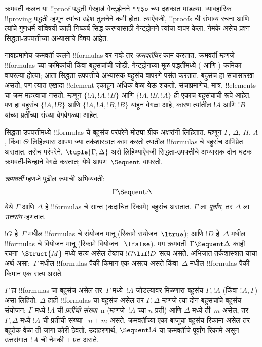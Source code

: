 \documentclass[../../../include/open-logic-section]{subfiles}
\begin{document}


क्रमवर्ती कलन या !!{proof} पद्धती गेरहार्ड
गेन्ट्झेनने १९३० च्या दशकात मांडल्या. व्यावहारिक
!!{proving} पद्धती म्हणून त्यांचा उद्देश तुलनेने कमी
होता. त्याऐवजी, !!{proof}s ची संभाव्य रचना आणि
त्यांचे गुणधर्म यांविषयी काही निष्कर्ष सिद्ध करण्यासाठी
गेन्ट्झेनने त्यांचा वापर केला. नेमके असेच प्रश्न
सिद्धता-उपपत्तीच्या अभ्यासाचे विषय आहेत.

नावाप्रमाणेच क्रमवर्ती कलने !!{formula}s वर
नव्हे तर \emph{क्रमवर्तींवर} काम करतात. क्रमवर्ती
म्हणजे !!{formula}s च्या क्रमिकांची किंवा बहुसंचांची
जोडी. गेन्ट्झेनच्या मूळ पद्धतींमध्ये ( आणि
) क्रमिका वापरल्या होत्या; आता
सिद्धता-उपपत्तीचे अभ्यासक बहुसंच वापरणे पसंत करतात.
बहुसंच हा संचासारखा असतो, पण त्यात एखादा
!!{element} एकाहून अधिक वेळा येऊ शकतो.
संचाप्रमाणेच, मात्र, !!{element}s चा क्रम महत्त्वाचा
नसतो. म्हणून $\{!A, !A, !B\}$ आणि
$\{!A, !B, !A\}$ ही एकाच बहुसंचाची रूपे आहेत.
पण हा बहुसंच $\{!A,
!B\}$ आणि $\{!A, !A, !B, !B\}$ यांहून वेगळा आहे,
कारण त्यांतील $!A$ आणि $!B$ यांच्या प्रतींच्या
संख्या वेगवेगळ्या आहेत.

सिद्धता-उपपत्तीमध्ये !!{formula}s चे बहुसंच
परंपरेने मोठ्या ग्रीक अक्षरांनी लिहितात. म्हणून
$\Gamma$, $\Delta$, $\Pi$, $\Lambda$, किंवा
$\Theta$ लिहिल्यास आपण ज्या तर्कशास्त्रात काम
करतो त्यातील !!{formula}s चे बहुसंच अभिप्रेत असतात.
तसेच परंपरेने, $\tuple{\Gamma, \Delta}$ असे लिहिण्याऐवजी
सिद्धता-उपपत्तीचे अभ्यासक दोन घटक क्रमवर्ती-चिन्हाने
वेगळे करतात; येथे आपण~$\Sequent$ वापरतो.

\begin{defn}[क्रमवर्ती]
\emph{क्रमवर्ती} म्हणजे पुढील रूपाची अभिव्यक्ती:
\[
\Gamma \Sequent \Delta
\]
येथे $\Gamma$ आणि $\Delta$ हे !!{formula}s चे
सान्त (कदाचित रिकामे) बहुसंच असतात. $\Gamma$ ला
\emph{पूर्वांग}, तर $\Delta$ ला \emph{उत्तरांग} म्हणतात.
\end{defn}

$!G$ हे~$\Gamma$ मधील !!{formula}s चे संयोजन
मानू (रिकामे संयोजन~$\ltrue$); आणि $!D$ हे~$\Delta$
मधील !!{formula}s चे वियोजन मानू (रिकामे वियोजन
~$\lfalse$). मग क्रमवर्ती~$\Gamma \Sequent \Delta$
काही रचना~$\Struct{M}$ मध्ये सत्य असेल
तेव्हाच $!G \lif !D$ सत्य असते. अभिजात
तर्कशास्त्रात याचा अर्थ असा:~$\Gamma$ मधील
!!{formula}s पैकी किमान एक असत्य असते किंवा~$\Delta$
मधील !!{formula}s पैकी किमान एक सत्य असते.

$\Gamma$ हा !!{formula}s चा बहुसंच असेल
तर~$\Gamma$ मध्ये~$!A$ जोडल्यावर मिळणारा बहुसंच $\Gamma, !A$
(किंवा $!A, \Gamma$) असा लिहितो. $\Delta$ हाही
!!{formula}s चा बहुसंच असेल तर $\Gamma, \Delta$
म्हणजे त्या दोन बहुसंचांचे बहुसंच-संयोजन: $\Gamma$
मध्ये $!A$ ची \emph{प्रतींची संख्या}~n (म्हणजे~$!A$
च्या $n$ प्रती) आणि $\Delta$ मध्ये ती~$m$ असेल,
तर $\Gamma, \Delta$ मध्ये $!A$ ची प्रतींची संख्या
~$n+m$ असते. क्रमवर्तीच्या एका बाजूचा बहुसंच रिकामा
असेल तर बहुतेक वेळा ती जागा कोरी ठेवतो. उदाहरणार्थ,
$\Sequent !A$ या क्रमवर्तीचे पूर्वांग रिकामे असून
उत्तरांगात~$!A$ ची नेमकी~$1$ प्रत असते.
\end{document}

